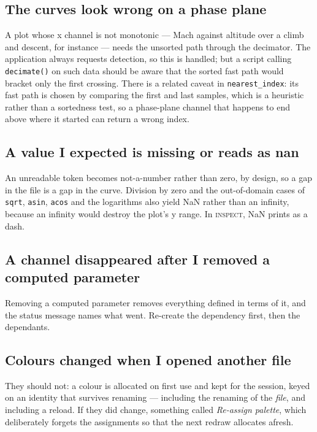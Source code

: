\documentclass[11pt,a4paper,oneside]{report}
\newcommand{\code}[1]{\texttt{#1}}
\newcommand{\tab}[1]{\textsc{#1}}
\begin{document}
\subsection{The curves look wrong on a phase plane}

A plot whose x channel is not monotonic --- Mach against altitude over a climb
and descent, for instance --- needs the unsorted path through the decimator. The
application always requests detection, so this is handled; but a script calling
\code{decimate()} on such data should be aware that the sorted fast path would
bracket only the first crossing. There is a related caveat in
\code{nearest\_index}: its fast path is chosen by comparing the first and last
samples, which is a heuristic rather than a sortedness test, so a phase-plane
channel that happens to end above where it started can return a wrong index.

\subsection{A value I expected is missing or reads as nan}

An unreadable token becomes not-a-number rather than zero, by design, so a gap
in the file is a gap in the curve. Division by zero and the out-of-domain cases
of \code{sqrt}, \code{asin}, \code{acos} and the logarithms also yield NaN
rather than an infinity, because an infinity would destroy the plot's y range.
In \tab{inspect}, NaN prints as a dash.

\subsection{A channel disappeared after I removed a computed parameter}

Removing a computed parameter removes everything defined in terms of it, and the
status message names what went. Re-create the dependency first, then the
dependants.

\subsection{Colours changed when I opened another file}

They should not: a colour is allocated on first use and kept for the session,
keyed on an identity that survives renaming --- including the renaming of the
\emph{file}, and including a reload. If they did change, something called
\emph{Re-assign palette}, which deliberately forgets the assignments so that the
next redraw allocates afresh.
\end{document}
